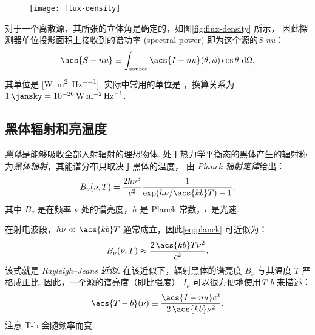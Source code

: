 \begin{figure}[htp]
  \centering
  \texttt{[image: flux-density]}
  \label{fig:flux-density}
\end{figure}

对于一个离散源，其所张的立体角是确定的，如图\autoref{fig:flux-density} 所示，
因此探测器单位投影面积上接收到的谱功率 (spectral power)
即为这个源的\emph{\acf{S-nu}}：
\begin{equation}
  \label{eq:flux-density}
  \acs{S-nu} \equiv
    \int_{\R{source}} \acs{I-nu}(\theta,\phi) \cos\theta \,\D{\Omega} ,
\end{equation}
其单位是 [\si{\watt\per\square\meter\per\hertz}].
实际中常用的单位是 \si{\jansky}，换算关系为
$\SI{1}{\jansky} = \SI{e-26}{\watt\per\square\meter\per\hertz}$.

\subsection{黑体辐射和亮温度}

\emph{黑体}是能够吸收全部入射辐射的理想物体.
处于热力学平衡态的黑体产生的辐射称为\emph{黑体辐射}，其能谱分布只取决于黑体的温度，
由 \emph{Planck 辐射定律}给出：
\begin{equation}
  \label{eq:planck}
  B_{\nu}(\nu, T) = \frac{2 h \nu^3}{c^2}
    \frac{1}{\exp(h \nu / \acs{kb} T) - 1} ,
\end{equation}
其中 $B_{\nu}$ 是在频率 $\nu$ 处的谱亮度，$h$ 是 Planck 常数，$c$ 是光速.

在射电波段，$h\nu \ll \acs{kb}T$ 通常成立，因此\autoref{eq:planck}
可近似为：
\begin{equation}
  \label{eq:rj-approx}
  B_{\nu}(\nu, T) \approx \frac{2\,\acs{kb}T \nu^2}{c^2} .
\end{equation}
该式就是 \emph{Rayleigh--Jeans 近似}.
在该近似下，辐射黑体的谱亮度 $B_{\nu}$ 与其温度 $T$ 严格成正比.
因此，一个源的谱亮度（即比强度） $I_{\nu}$
可以很方便地使用\emph{\acf{T-b}} 来描述：
\begin{equation}
  \label{eq:Tb}
  \acs{T-b}(\nu) \equiv \frac{\acs{I-nu} c^2}{2 \,\acs{kb} \nu^2} .
\end{equation}
注意 \acs{T-b} 会随频率而变.

